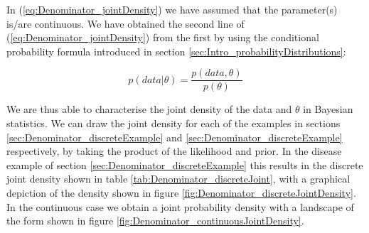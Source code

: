 \documentclass[11pt,fullpage]{book}
\begin{document}
In (\ref{eq:Denominator_jointDensity}) we have assumed that the parameter(s) is/are continuous. We have obtained the second line of (\ref{eq:Denominator_jointDensity}) from the first by using the conditional probability formula introduced in section \ref{sec:Intro_probabilityDistributions}:

\begin{equation}
p(data|\theta) = \frac{p(data,\theta)}{p(\theta)}
\end{equation} 

We are thus able to characterise the joint density of the data and $\theta$ in Bayesian statistics. We can draw the joint density for each of the examples in sections \ref{sec:Denominator_discreteExample} and \ref{sec:Denominator_discreteExample} respectively, by taking the product of the likelihood and prior. In the disease example of section \ref{sec:Denominator_discreteExample} this results in the discrete joint density shown in table \ref{tab:Denominator_discreteJoint}, with a graphical depiction of the density shown in figure \ref{fig:Denominator_discreteJointDensity}. In the continuous case we obtain a joint probability density with a landscape of the form shown in figure \ref{fig:Denominator_continuousJointDensity}.
\end{document}
